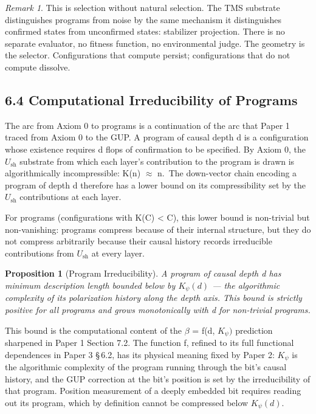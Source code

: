 \documentclass[11pt,oneside]{report}
\newtheorem{proposition}[theorem]{Proposition}
\theoremstyle{definition}
\theoremstyle{remark}
\newtheorem{remark}[theorem]{Remark}
\begin{document}
\begin{remark}
This is selection without natural selection. The TMS substrate
distinguishes programs from noise by the same mechanism it distinguishes
confirmed states from unconfirmed states: stabilizer projection. There
is no separate evaluator, no fitness function, no environmental judge.
The geometry is the selector. Configurations that compute persist;
configurations that do not compute dissolve.
\end{remark}

\subsection*{6.4 Computational Irreducibility of Programs}

The arc from Axiom 0 to programs is a continuation of the arc that Paper
1 traced from Axiom 0 to the GUP. A program of causal depth d is a
configuration whose existence requires d flops of confirmation to be
specified. By Axiom 0, the \ensuremath{U_{\mathrm{sh}}} substrate from which each layer's
contribution to the program is drawn is algorithmically incompressible:
K(n) \ensuremath{\approx} n.~The down-vector chain encoding a program of depth d therefore
has a lower bound on its compressibility set by the \ensuremath{U_{\mathrm{sh}}} contributions at
each layer.

For programs (configurations with K(C) \textless{} \textbar C\textbar),
this lower bound is non-trivial but non-vanishing: programs compress
because of their internal structure, but they do not compress
arbitrarily because their causal history records irreducible
contributions from \ensuremath{U_{\mathrm{sh}}} at every layer.

\begin{proposition}[Program Irreducibility]
A program of causal depth d has
minimum description length bounded below by \ensuremath{K_{\psi}(d)} --- the algorithmic
complexity of its polarization history along the depth axis. This bound
is strictly positive for all programs and grows monotonically with d for
non-trivial programs.
\end{proposition}

This bound is the computational content of the \ensuremath{\beta} = f(d, \ensuremath{K_{\psi})} prediction
sharpened in Paper 1 Section 7.2. The function f, refined to its full
functional dependences in Paper 3 \S\,6.2, has its physical meaning fixed
by Paper 2: \ensuremath{K_{\psi}} is the algorithmic complexity of the program running
through the bit's causal history, and the GUP correction at the bit's
position is set by the irreducibility of that program. Position
measurement of a deeply embedded bit requires reading out its program,
which by definition cannot be compressed below \ensuremath{K_{\psi}(d).}
\end{document}
